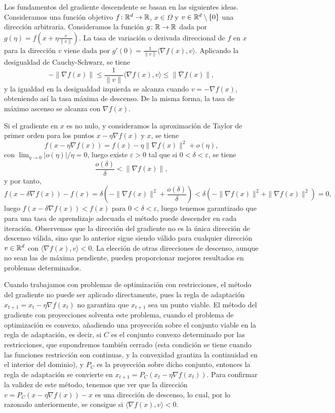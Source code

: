 Los fundamentos del gradiente descendente se basan en las siguientes ideas. Consideramos una función objetivo $f \colon \mathbb{R}^d \to \mathbb{R}$, $x \in \Omega$ y $v \in \mathbb{R}^d \setminus \{0\}$ una dirección arbitraria. Consideramos la función $g \colon \mathbb{R} \to \mathbb{R}$ dada por $g(\eta) = f(x + \eta \frac{v}{\|v\|})$. La tasa de variación o derivada direccional de $f$ en $x$ para la dirección $v$ viene dada por $g'(0) = \frac{1}{\|v\|}\langle \nabla f(x), v \rangle$. Aplicando la desigualdad de Cauchy-Schwarz, se tiene
\[  -\|\nabla f(x)\| \le \frac{1}{\|v\|}\langle \nabla f(x), v \rangle \le \|\nabla f(x)\|,\]
y la igualdad en la desigualdad izquierda se alcanza cuando $v = - \nabla f(x)$, obteniendo así la tasa máxima de descenso. De la misma forma, la tasa de máximo ascenso se alcanza con $\nabla f(x)$.

Si el gradiente en $x$ es no nulo, y consideramos la aproximación de Taylor de primer orden para los puntos $x - \eta\nabla f(x)$ y $x$, se tiene
\[ f(x - \eta\nabla f(x)) = f(x) - \eta\|\nabla f(x)\|^2 + o(\eta),\]
con $\lim_{\eta \to 0}|o(\eta)|/\eta = 0$, luego existe $\varepsilon > 0$ tal que si $0 < \delta < \varepsilon$, se tiene
\[\frac{o(\delta)}{\delta} < \|\nabla f(x)\|, \]
y por tanto,
\[f(x - \delta\nabla f(x)) - f(x) = \delta\left(-\|\nabla f(x)\|^2+ \frac{o(\delta)}{\delta}\right) < \delta(-\|\nabla f(x)\|^2+\|\nabla f(x)\|^2) = 0, \]
luego $f(x - \delta\nabla f(x)) < f(x)$ para $0 < \delta < \varepsilon$, luego tenemos garantizado que para una tasa de aprendizaje adecuada el método puede descender en cada iteración. Observemos que la dirección del gradiente no es la única dirección de descenso válida, sino que lo anterior sigue siendo válido para cualquier dirección $v \in \mathbb{R}^d$ con $\langle \nabla f(x), v \rangle < 0$. La elección de otras direcciones de descenso, aunque no sean las de máxima pendiente, pueden proporcionar mejores resultados en problemas determinados.

Cuando trabajamos con problemas de optimización con restricciones, el método del gradiente no puede ser aplicado directamente, pues la regla de adaptación $x_{t+1} = x_t - \eta \nabla f(x_t)$ no garantiza que $x_{t+1}$ sea un punto viable. El método del gradiente con proyecciones solventa este problema, cuando el problema de optimización es convexo, añadiendo una proyección sobre el conjunto viable en la regla de adaptación, es decir, si $C$ es el conjunto convexo determinado por las restricciones, que supondremos también cerrado (esta condición se tiene cuando las funciones restricción son continuas, y la convexidad grantiza la continuidad en el interior del dominio), y $P_C$ es la proyección sobre dicho conjunto, entonces la regla de adaptación se convierte en $x_{t+1} = P_C(x_t - \eta \nabla f(x_t))$. Para confirmar la validez de este método, tenemos que ver que la dirección $v = P_C(x - \eta\nabla f(x)) - x$ es una dirección de descenso, lo cual, por lo razonado anteriormente, se consigue si $\langle \nabla f(x), v \rangle < 0$.

